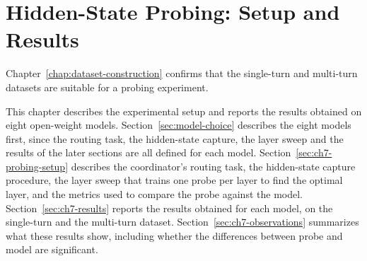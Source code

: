 \chapter{Hidden-State Probing: Setup and Results}
\label{chap:probing-results}

Chapter~\ref{chap:dataset-construction} confirms that the single-turn and multi-turn datasets are suitable for a probing experiment.

This chapter describes the experimental setup and reports the results obtained on eight open-weight models. Section~\ref{sec:model-choice} describes the eight models first, since the routing task, the hidden-state capture, the layer sweep and the results of the later sections are all defined for each model. Section~\ref{sec:ch7-probing-setup} describes the coordinator's routing task, the hidden-state capture procedure, the layer sweep that trains one probe per layer to find the optimal layer, and the metrics used to compare the probe against the model. Section~\ref{sec:ch7-results} reports the results obtained for each model, on the single-turn and the multi-turn dataset. Section~\ref{sec:ch7-observations} summarizes what these results show, including whether the differences between probe and model are significant.








\clearpage

